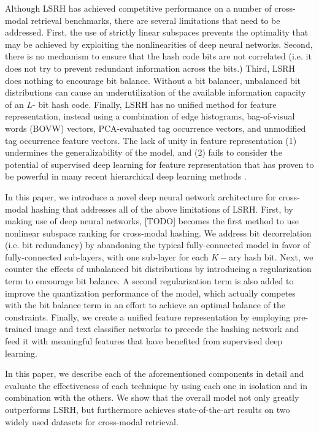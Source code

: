 \documentclass[letterpaper]{article}
\begin{document}
Although LSRH has achieved competitive performance on a number of cross-modal retrieval benchmarks, there are several limitations that need to be addressed. First, the use of strictly linear subspaces prevents the optimality that may be achieved by exploiting the nonlinearities of deep neural networks. Second, there is no mechanism to ensure that the hash code bits are not correlated (i.e. it does not try to prevent redundant information across the bits.) Third, LSRH does nothing to encourage bit balance. Without a bit balancer, unbalanced bit distributions can cause an underutilization of the available information capacity of an $L$- bit hash code. Finally, LSRH has no unified method for feature representation, instead using a combination of edge histograms, bag-of-visual words (BOVW) vectors, PCA-evaluated tag occurrence vectors, and unmodified tag occurrence feature vectors. The lack of unity in feature representation (1) undermines the generalizability of the model, and (2) fails to consider the potential of supervised deep learning for feature representation that has proven to be powerful in many recent hierarchical deep learning methods \cite{dvsh,dcmh,autoen,chn,cdq}.

In this paper, we introduce a novel deep neural network architecture for cross-modal hashing that addresses all of the above limitations of LSRH. First, by making use of deep neural networks, [TODO] becomes the first method to use nonlinear subspace ranking for cross-modal hashing. We address bit decorrelation (i.e. bit redundancy) by abandoning the typical fully-connected model in favor of fully-connected sub-layers, with one sub-layer for each $K-$ary hash bit. Next, we counter the effects of unbalanced bit distributions by introducing a regularization term to encourage bit balance. A second regularization term is also added to improve the quantization performance of the model, which actually competes with the bit balance term in an effort to achieve an optimal balance of the constraints. Finally, we create a unified feature representation by employing pre-trained image and text classifier networks to precede the hashing network and feed it with meaningful features that have benefited from supervised deep learning.

In this paper, we describe each of the aforementioned components in detail and evaluate the effectiveness of each technique by using each one in isolation and in combination with the others. We show that the overall model not only greatly outperforms LSRH, but furthermore achieves state-of-the-art results on two widely used datasets for cross-modal retrieval.
\end{document}
